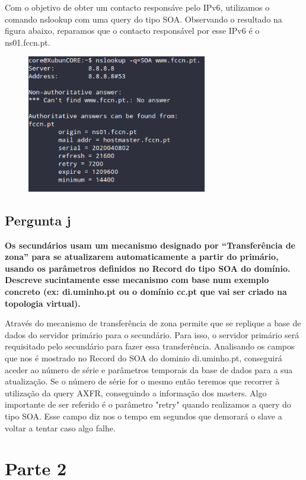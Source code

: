 \documentclass[a4paper]{report}
\begin{document}
Com o objetivo de obter um contacto responsáve pelo IPv6, utilizamos
o comando nslookup com uma query do tipo SOA. Observando o resultado
na figura abaixo, reparamos que o contacto responsável por esse IPv6 
é o ns01.fccn.pt.

\begin{figure}[H]
    \centering 
    \includegraphics[width=0.7\textwidth]{images/fccn_pt.png}  
    \caption{}
    \label{fig:fccn_pt}
\end{figure}

\section{Pergunta j}
\textbf{Os secundários usam um mecanismo designado por “Transferência de zona”
para se atualizarem automaticamente a partir do primário, usando os parâmetros
definidos no Record do tipo SOA do domínio. Descreve sucintamente esse mecanismo
com base num exemplo concreto (ex: di.uminho.pt ou o domínio cc.pt que vai ser
criado na topologia virtual).}

Através do mecanismo de transferência de zona permite que se replique a base de 
dados do servidor primário para o secundário. Para isso, o servidor primário
será requisitado pelo secundário para fazer essa transferência. Analisando os 
campos que nos é mostrado no Record do SOA do dominio di.uminho.pt, conseguirá
aceder ao número de série e parâmetros temporais da base de dados para a sua 
atualização. Se o número de série for o mesmo então teremos que recorrer 
à utilização da query AXFR, conseguindo a informação dos masters. Algo importante
de ser referido é o parâmetro "retry" quando realizamos a query do tipo SOA. 
Esse campo diz nos o tempo em segundos que demorará o slave a voltar a tentar 
caso algo falhe.

\chapter{Parte 2}
\end{document}

